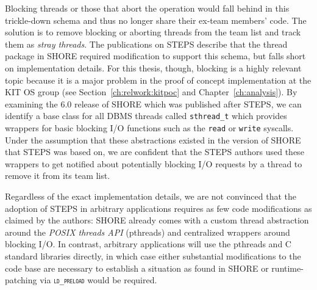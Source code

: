 \documentclass[12pt,a4paper]{book}
\begin{document}
Blocking threads or those that abort the operation would fall behind in this trickle-down schema and thus no longer share their ex-team members' code.
The solution is to remove blocking or aborting threads from the team list and track them as \emph{stray threads}.
The publications on STEPS describe that the thread package in SHORE required modification to support this schema, but falls short on implementation details.
For this thesis, though, blocking is a highly relevant topic because it is a major problem in the proof of concept implementation at the KIT OS group (see Section~\ref{ch:relwork:kitpoc} and Chapter~\ref{ch:analysis}).
By examining the 6.0 release of SHORE which was published after STEPS, we can identify a base class for all DBMS threads called \texttt{sthread\_t} which provides wrappers for basic blocking I/O functions such as the \texttt{read} or \texttt{write} syscalls.
Under the assumption that these abstractions existed in the version of SHORE that STEPS was based on, we are confident that the STEPS authors used these wrappers to get notified about potentially blocking I/O requests by a thread to remove it from its team list.~\cite{shoreRelease,shore}

Regardless of the exact implementation details, we are not convinced that the adoption of STEPS in arbitrary applications requires as few code modifications as claimed by the authors:
SHORE already comes with a custom thread abstraction around the \emph{POSIX threads API} (pthreads) and centralized wrappers around blocking I/O.
In contrast, arbitrary applications will use the pthreads and C standard libraries directly, in which case
either substantial modifications to the code base are necessary to establish a situation as found in SHORE
or runtime-patching via \textsc{\texttt{ld\_preload}} would be required.
\end{document}
